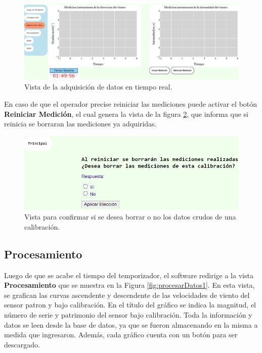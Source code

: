 \begin{figure}[H]
    \centering
    \includegraphics[width=1\linewidth]{Figuras/AplicacionWeb/frontend/adquisicionDatos.png}
    \caption{Vista de la adquisición de datos en tiempo real.}
    \label{fig:adquisicionDatos}
\end{figure}

En caso de que el operador precise reiniciar las mediciones puede activar el botón \textbf{Reiniciar Medición}, el cual genera la vista de la figura \ref{fig:borrarMediciones}, que informa que si reinicia se borraran las mediciones ya adquiridas.

\begin{figure}[H]
    \centering
    \includegraphics[width=0.8\linewidth]{Figuras/AplicacionWeb/frontend/borrarMediciones.png}
    \caption{Vista para confirmar si se desea borrar o no los datos crudos de una calibración.}
    \label{fig:borrarMediciones}
\end{figure}



\subsection{Procesamiento}\label{sec:ProcesamientoDatos}
Luego de que se acabe el tiempo del temporizador, el software redirige a la vista \textbf{Procesamiento} que se muestra en la Figura \ref{fig:procesarDatos1}. En esta vista, se grafican las curvas ascendente y descendente de las velocidades de viento del sensor patron y bajo calibración. En el título del gráfico se indica la magnitud, el número de serie y patrimonio del sensor bajo calibración. Toda la información y datos se leen desde la base de datos, ya que se fueron almacenando en la misma a medida que ingresaron. Además, cada gráfico cuenta con un botón para ser descargado.

